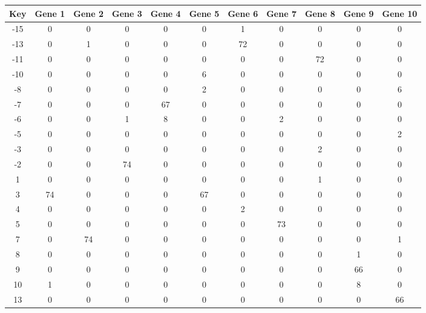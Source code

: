 \begin{tabular}{|c|c|c|c|c|c|c|c|c|c|c|}
\hline
Key & Gene 1 & Gene 2 & Gene 3 & Gene 4 & Gene 5 & Gene 6 & Gene 7 & Gene 8 & Gene 9 & Gene 10 \\
\hline
-15 & 0 & 0 & 0 & 0 & 0 & 1 & 0 & 0 & 0 & 0 \\
-13 & 0 & 1 & 0 & 0 & 0 & 72 & 0 & 0 & 0 & 0 \\
-11 & 0 & 0 & 0 & 0 & 0 & 0 & 0 & 72 & 0 & 0 \\
-10 & 0 & 0 & 0 & 0 & 6 & 0 & 0 & 0 & 0 & 0 \\
-8 & 0 & 0 & 0 & 0 & 2 & 0 & 0 & 0 & 0 & 6 \\
-7 & 0 & 0 & 0 & 67 & 0 & 0 & 0 & 0 & 0 & 0 \\
-6 & 0 & 0 & 1 & 8 & 0 & 0 & 2 & 0 & 0 & 0 \\
-5 & 0 & 0 & 0 & 0 & 0 & 0 & 0 & 0 & 0 & 2 \\
-3 & 0 & 0 & 0 & 0 & 0 & 0 & 0 & 2 & 0 & 0 \\
-2 & 0 & 0 & 74 & 0 & 0 & 0 & 0 & 0 & 0 & 0 \\
1 & 0 & 0 & 0 & 0 & 0 & 0 & 0 & 1 & 0 & 0 \\
3 & 74 & 0 & 0 & 0 & 67 & 0 & 0 & 0 & 0 & 0 \\
4 & 0 & 0 & 0 & 0 & 0 & 2 & 0 & 0 & 0 & 0 \\
5 & 0 & 0 & 0 & 0 & 0 & 0 & 73 & 0 & 0 & 0 \\
7 & 0 & 74 & 0 & 0 & 0 & 0 & 0 & 0 & 0 & 1 \\
8 & 0 & 0 & 0 & 0 & 0 & 0 & 0 & 0 & 1 & 0 \\
9 & 0 & 0 & 0 & 0 & 0 & 0 & 0 & 0 & 66 & 0 \\
10 & 1 & 0 & 0 & 0 & 0 & 0 & 0 & 0 & 8 & 0 \\
13 & 0 & 0 & 0 & 0 & 0 & 0 & 0 & 0 & 0 & 66 \\
\hline
\end{tabular}